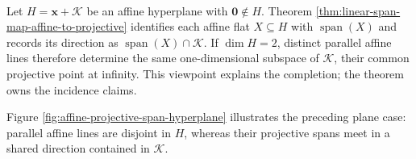 \begin{perspective} \label{per:projective-completion-from-affine-hyperplane} \\
Let $H=\mathbf{x}+\mathcal{K}$ be an affine hyperplane with $\mathbf{0}\notin H$. Theorem \ref{thm:linear-span-map-affine-to-projective} identifies each affine flat $X\subseteq H$ with $\operatorname{span}(X)$ and records its direction as $\operatorname{span}(X)\cap\mathcal{K}$. If $\dim H=2$, distinct parallel affine lines therefore determine the same one-dimensional subspace of $\mathcal{K}$, their common projective point at infinity. This viewpoint explains the completion; the theorem owns the incidence claims.
\end{perspective}

Figure \ref{fig:affine-projective-span-hyperplane} illustrates the preceding plane case: parallel affine lines are disjoint in $H$, whereas their projective spans meet in a shared direction contained in $\mathcal{K}$.

\begin{illustrationfigure}[H]
  \centering
  
  \caption{The affine plane $H=\mathbf{x}+\mathcal{K}$, direction plane $\mathcal{K}$, parallel lines $X,Y$, and shaded spans $\operatorname{span}(X),\operatorname{span}(Y)$. The spans meet along the dashed subspace $D=\operatorname{span}(X)\cap\mathcal{K}=\operatorname{span}(Y)\cap\mathcal{K}$, the common projective point at infinity.}
  \label{fig:affine-projective-span-hyperplane}
\end{illustrationfigure}
